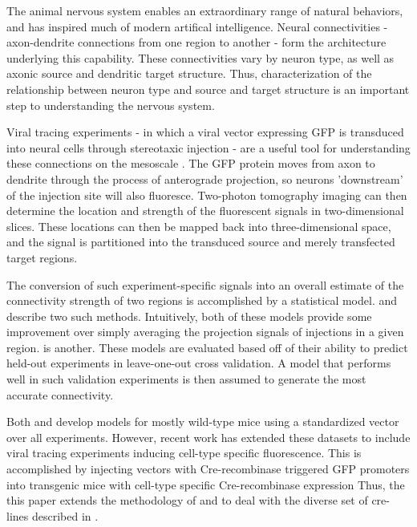 \documentclass[NETN,manuscript]{stjour-new}
\begin{document}
The animal nervous system enables an extraordinary range of natural behaviors, and has inspired much of modern artifical intelligence.
Neural connectivities - axon-dendrite connections from one region to another - form the architecture underlying this capability.
These connectivities vary by neuron type, as well as axonic source and dendritic target structure.
Thus, characterization of the relationship between neuron type and source and target structure is an important step to understanding the nervous system.

Viral tracing experiments - in which a viral vector expressing GFP is transduced into neural cells through stereotaxic injection - are a useful tool for understanding these connections on the mesoscale \citep{Chamberlin1998-hi,Harris2012-fw, Daigle2018-gd}.
The GFP protein moves from axon to dendrite through the process of anterograde projection, so neurons 'downstream' of the injection site will also fluoresce.
Two-photon tomography imaging can then determine the location and strength of the fluorescent signals in two-dimensional slices.
These locations can then be mapped back into three-dimensional space, and
the signal is partitioned into the transduced source and merely transfected target regions.


The conversion of such experiment-specific signals into an overall estimate of the connectivity strength of two regions is accomplished by a statistical model.
\citet{Oh2014-kh} and \citet{Knox2019-ot} describe two such methods.
Intuitively, both of these models provide some improvement over simply averaging the projection signals of injections in a given region.
\citet{} is another.
These models are evaluated based off of their ability to predict held-out experiments in leave-one-out cross validation.
A model that performs well in such validation experiments is then assumed to generate the most accurate connectivity. 

Both \citet{Oh2014-kh} and \citet{Knox2019-ot} develop models for mostly wild-type mice using a standardized vector over all experiments.
However, recent work \citep{Harris2019-mr} has extended these datasets to include viral tracing experiments inducing cell-type specific fluorescence.
This is accomplished by injecting vectors with Cre-recombinase triggered GFP promoters into transgenic mice with cell-type specific Cre-recombinase expression
Thus, the this paper extends the methodology of \citet{Oh2014-kh} and \citet{Knox2019-ot} to deal with the diverse set of cre-lines described in \citet{Harris2019-mr}.
\end{document}
